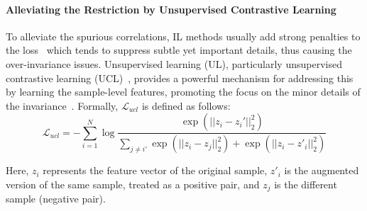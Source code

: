 


\paragraph{Alleviating the Restriction by Unsupervised Contrastive Learning} 
To alleviate the spurious correlations, IL methods usually add strong penalties to the loss~\citep{irmv1,v-rex,fishr} which tends to suppress subtle yet important details, thus causing the over-invariance issues.
Unsupervised learning (UL), particularly unsupervised contrastive learning (UCL)~\citep{oord2018representation}, provides a powerful mechanism for addressing this by learning the sample-level features, promoting the focus on the minor details of the invariance~\citep{features_CL,DC_leCun,chen2020simple,qin-etal-2022-gl,zhang2022towards}. 
Formally, $\mathcal{L}_{ucl}$ is defined as follows:
\begin{equation} 
\mathcal{L}_{ucl}=-\sum_{i=1}^N\log\frac{\exp(||z_i-z_{i}'||^2_2)}{\sum_{j\neq i'}\exp(||z_i-z_j||^2_2)+\exp(||z_i-z'_i||^2_2)} 
\label{eq: diverse_loss} 
\end{equation}

Here, $z_i$ represents the feature vector of the original sample, $z'_i$ is the augmented version of the same sample, treated as a positive pair, and $z_j$ is the different sample (negative pair). 

